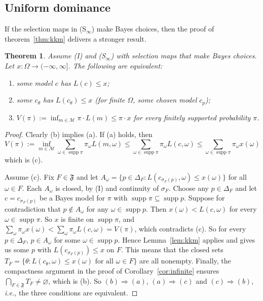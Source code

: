\documentclass[11pt]{article}
\newtheorem{theorem}{Theorem}[section]
\theoremstyle{definition}
\theoremstyle{remark}
\newcommand{\M}{\mathcal M}
\newcommand{\F}{\mathfrak F}
\newcommand{\supp}{\operatorname{supp}}
\begin{document}
\subsection{Uniform dominance}


If the selection maps in (S$_\infty$) make Bayes choices, then the proof of theorem~\ref{thm:kkm} delivers a stronger result.

\begin{theorem}\label{thm:margin}
Assume (I) and (S$_\infty$) with selection maps that make Bayes choices. Let $x:\Omega\to(-\infty,\infty]$. The following are equivalent:
\begin{enumerate}[label=(\alph*)]
\item some model $c$ has $L(c)\le x$;
\item some $c_\theta$ has $L(c_\theta)\le x$ (for finite $\Omega$, some chosen model $c_p$);
\item $V(\pi):=\inf_{m\in\M}\pi\cdot L(m)\le\pi\cdot x$ for every finitely supported probability $\pi$.
\end{enumerate}
\end{theorem}
\begin{proof}
Clearly (b) implies (a). If (a) holds, then
\[
V(\pi):=\inf_{m\in\M}\sum_{\omega\in\supp\pi}\pi_\omega L(m,\omega)\le\sum_{\omega\in\supp\pi}\pi_\omega L(c,\omega)\le\sum_{\omega\in\supp\pi}\pi_\omega x(\omega)
\]
which is (c).

Assume (c). Fix $F\in\F$ and let $A_\omega=\{p\in\Delta_F:L(c_{\sigma_F(p)},\omega)\le x(\omega)\}$ for all $\omega\in F$. Each $A_\omega$ is closed, by (I) and continuity of $\sigma_F$. Choose any $p\in\Delta_F$ and let $c=c_{\sigma_F(p)}$ be a Bayes model for $\pi$ with $\supp\pi\subseteq\supp p$. Suppose for contradiction that $p\not\in A_\omega$ for any $\omega\in\supp p$. Then $x(\omega)<L(c,\omega)$ for every $\omega\in\supp\pi$. So $x$ is finite on $\supp\pi$, and $\sum_\omega\pi_\omega x(\omega)<\sum_\omega\pi_\omega L(c,\omega)=V(\pi)$, which contradicts (c). So for every $p\in\Delta_F$, $p\in A_\omega$ for some $\omega\in\supp p$. Hence Lemma~\ref{lem:kkm} applies and gives us some $p$ with $L(c_{\sigma_F(p)})\le x$ on $F$. This means that the closed sets $T_F=\{\theta:L(c_\theta,\omega)\le x(\omega)\text{ for all }\omega\in F\}$ are all nonempty. Finally, the compactness argument in the proof of Corollary~\ref{cor:infinite} ensures $\bigcap_{F\in\F}T_F\neq \varnothing$, which is (b). So $(b)\Rightarrow (a)$, $(a)\Rightarrow (c)$ and $(c)\Rightarrow (b)$, \textit{i.e.}, the three conditions are equivalent.
\end{proof}
\end{document}
